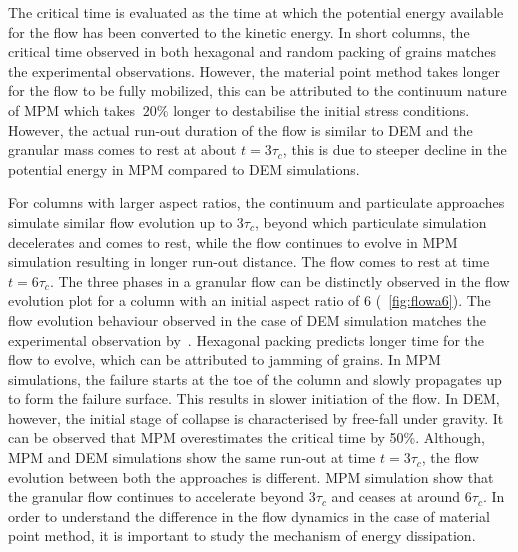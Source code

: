 The critical time is evaluated as the time at which the potential energy 
available for the flow has been converted to the kinetic energy. In short 
columns, the critical time observed in both hexagonal and random packing of 
grains matches the experimental observations. However, the material point 
method takes longer for the flow to be fully mobilized, this can be attributed 
to the continuum nature of MPM which takes $~20\%$ longer to destabilise the 
initial stress conditions. However, the actual run-out duration of the flow is 
similar to DEM and the granular mass comes to rest at about 
$\textit{t}=3\tau_{c}$, this is due to steeper decline in the potential energy 
in MPM compared to DEM simulations.
 
For columns with larger aspect ratios, the continuum and particulate approaches 
simulate similar flow evolution up to 3$\tau_{c}$, beyond 
which particulate simulation decelerates and comes to rest, while the flow 
continues to evolve in MPM simulation resulting in longer run-out distance. 
The flow comes to rest at time $\textit{t}=6\tau_{c}$. The 
three phases in a granular flow can be distinctly observed in the flow 
evolution plot for a column with an initial aspect ratio of 6 
(~\cref{fig:flowa6}). The flow evolution 
behaviour observed in the case of DEM simulation matches the experimental 
observation by~\citet{Lajeunesse2004}. Hexagonal packing predicts longer time 
for the flow to evolve, which can be attributed to jamming of grains. 
In MPM simulations, the failure starts at the toe of the column and slowly 
propagates up to form the failure surface. This results in slower initiation of 
the flow. In DEM, however, the initial stage of collapse is characterised by 
free-fall under gravity. It can be observed that MPM overestimates the critical 
time by 50\%. Although, MPM and DEM simulations show the same run-out at time 
$\textit{t}=3\tau_{c}$, the flow evolution between both the approaches is 
different. MPM simulation show that the granular flow continues to accelerate 
beyond $3\tau_c$ and ceases at around $6\tau_{c}$. In order to understand the 
difference in the flow dynamics in the case of material point method, it is 
important to study the mechanism of energy dissipation. 


